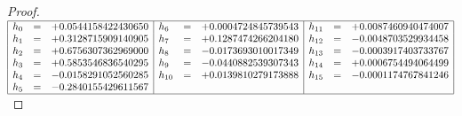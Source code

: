 \begin{proof}
$\begin{array}{|lcr|lcr|lcr|}
  \hline
     h_{ 0} &=& +0.0544158422430650    & h_{ 6} &=& +0.0004724845739543  & h_{11} &=& +0.0087460940474007
  \\ h_{ 1} &=& +0.3128715909140905    & h_{ 7} &=& +0.1287474266204180  & h_{12} &=& -0.0048703529934458
  \\ h_{ 2} &=& +0.6756307362969000    & h_{ 8} &=& -0.0173693010017349  & h_{13} &=& -0.0003917403733767
  \\ h_{ 3} &=& +0.5853546836540295    & h_{ 9} &=& -0.0440882539307343  & h_{14} &=& +0.0006754494064499
  \\ h_{ 4} &=& -0.0158291052560285    & h_{10} &=& +0.0139810279173888  & h_{15} &=& -0.0001174767841246
  \\ h_{ 5} &=& -0.2840155429611567    &        & &                      &        & &
  \\\hline
\end{array}$
\end{proof}
